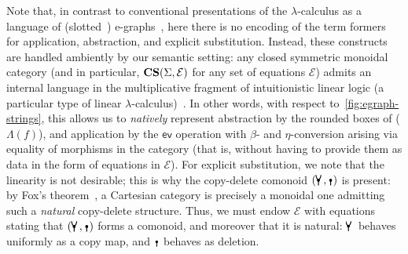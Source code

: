 Note that, in contrast to conventional presentations of the $\lambda$-calculus as a language of (slotted~\cite[Example 1]{slotted-egraphs}) e-graphs~\cite[Figure 10]{EggPaper}, here there is no encoding of the term formers for application, abstraction, and explicit substitution.
Instead, these constructs are handled ambiently by our semantic setting: any closed symmetric monoidal category (and in particular, $\mathbf{CS}(\Sigma, \mathcal{E})$ for any set of equations $\mathcal{E}$) admits an internal language in the multiplicative fragment of intuitionistic linear logic (a particular type of linear $\lambda$-calculus)~\cite[§ 1.7.3]{abramskyIntroductionCategoriesCategorical2010}.
In other words, with respect to~\autoref{fig:egraph-strings}, this allows us to \emph{natively} represent abstraction by the rounded boxes of ($\Lambda(f)$), and application by the $\textsf{ev}$ operation with $\beta$- and $\eta$-conversion arising via equality of morphisms in the category (that is, without having to provide them as data in the form of equations in $\mathcal{E}$).
For explicit substitution, we note that the linearity is not desirable; this is why the copy-delete comonoid $(\comonoid, \counit)$ is present: by Fox's theorem~\cite{foxCoalgebrasCartesianCategories1976}, a Cartesian category is precisely a monoidal one admitting such a \emph{natural} copy-delete structure.
Thus, we must endow $\mathcal{E}$ with equations stating that $(\comonoid, \counit)$ forms a comonoid, and moreover that it is natural: $\comonoid$ behaves uniformly as a copy map, and $\counit$ behaves as deletion.

